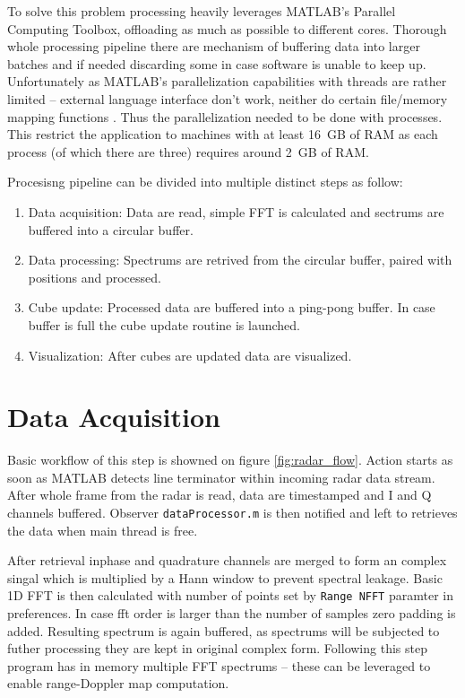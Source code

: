 To solve this problem processing heavily leverages MATLAB's Parallel Computing Toolbox, offloading as much as possible to different cores.
Thorough whole processing pipeline there are mechanism of buffering data into larger batches and if needed discarding some in case software is unable to keep up.
Unfortunately as MATLAB's parallelization capabilities with threads are rather limited  -- external language interface don't work, neither do certain file/memory mapping functions \cite{matlabParallel}.
Thus the parallelization needed to be done with processes.
This restrict the application to machines with at least 16~GB of RAM as each process (of which there are three) requires around 2~GB of RAM.

Procesisng pipeline can be divided into multiple distinct steps as follow:
\begin{enumerate}
  \item Data acquisition: Data are read, simple FFT is calculated and sectrums are buffered into a circular buffer.
  \item Data processing: Spectrums are retrived from the circular buffer, paired with positions and processed.
  \item Cube update: Processed data are buffered into a ping-pong buffer. In case buffer is full the cube update routine is launched.
  \item Visualization: After cubes are updated data are visualized.
\end{enumerate}

\section{Data Acquisition}

Basic workflow of this step is showned on figure \ref{fig:radar_flow}.
Action starts as soon as MATLAB detects line terminator within incoming radar data stream.
After whole frame from the radar is read, data are timestamped and I and Q channels buffered.
Observer \texttt{dataProcessor.m} is then notified and left to retrieves the data when main thread is free.

After retrieval inphase and quadrature channels are merged to form an complex singal which is multiplied by a Hann window to prevent spectral leakage.
Basic 1D FFT is then calculated with number of points set by \texttt{Range NFFT} paramter in preferences.
In case fft order is larger than the number of samples zero padding is added.
Resulting spectrum is again buffered, as spectrums will be subjected to futher processing they are kept in original complex form.
Following this step program has in memory multiple FFT spectrums -- these can be leveraged to enable range-Doppler map computation.

